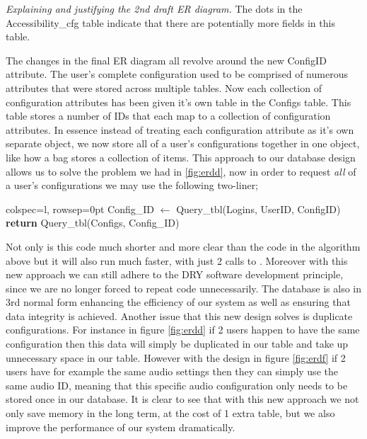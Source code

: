 \textit{Explaining and justifying the 2nd draft ER diagram.}
The dots in the {\sffamily Accessibility\_cfg} table indicate
that there are potentially more fields in this table. \\ \vspace{0.2cm}

The changes in the final ER diagram all revolve around the new
ConfigID attribute. The user's complete configuration used to
be comprised of numerous attributes that were stored across
multiple tables. Now each collection of configuration
attributes has been given it's own table in the
{\sffamily Configs} table. This table stores a number of IDs
that each map to a collection of configuration attributes.
In essence instead of treating each configuration attribute as
it's own separate object, we now store all of a user's
configurations together in one object, like how a bag stores
a collection of items. This approach to our database design
allows us to solve the problem we had in \ref{fig:erdd}, now
in order to request \textit{all} of a user's configurations
we may use the following two-liner;\\

\begin{center}
\begin{tblr}{colspec={l}, rowsep=0pt}
  {\sffamily Config\_ID} $\gets$ {\sffamily Query\_tbl(Logins, UserID, ConfigID)}\\
  {\sffamily \textbf{return} Query\_tbl(Configs, Config\_ID)}\\
\end{tblr}
\end{center}

Not only is this code much shorter and more clear than the
code in the algorithm above but it will also run much
faster, with just 2 calls to . Moreover
with this new approach we can still adhere to the DRY software
development principle, since we are no longer forced to repeat
code unnecessarily. The database is also in 3rd normal form
enhancing the efficiency of our system as
well as ensuring that data integrity is achieved.
Another issue that this new design solves
is duplicate configurations. For instance in figure
\ref{fig:erdd} if 2 users happen to have the same
configuration then this data will simply be duplicated in our
table and take up unnecessary space in our table. However
with the design in figure \ref{fig:erdf} if 2 users have for
example the same audio settings then they can simply use the
same audio ID, meaning that this specific audio configuration
only needs to be stored once in our database. It is clear to
see that with this new approach we not only save memory in
the long term, at the cost of 1 extra table, but we also
improve the performance of our system dramatically. \\
\vspace{0.2cm}

